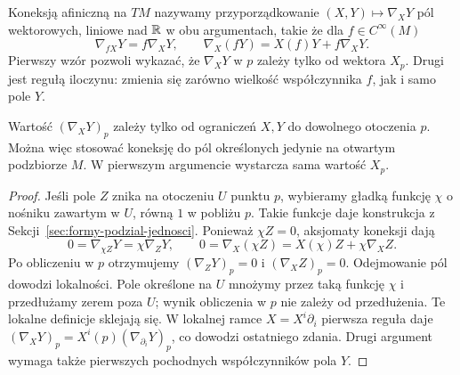 \begin{definicja}
\label{def:koneksja-afiniczna}
Koneksją afiniczną na $TM$ nazywamy przyporządkowanie
$(X,Y)\mapsto\nabla_XY$ pól wektorowych, liniowe
nad $\mathbb{R}$ w obu argumentach, takie że dla $f\in C^\infty(M)$
\begin{equation}\label{eq:koneksja-aksjomaty}
 \nabla_{fX}Y=f\nabla_XY,
 \qquad \nabla_X(fY)=X(f)Y+f\nabla_XY.
\end{equation}
Pierwszy wzór pozwoli wykazać, że $\nabla_XY$ w $p$ zależy
tylko od wektora $X_p$. Drugi jest regułą iloczynu:
zmienia się zarówno wielkość współczynnika $f$,
jak i samo pole $Y$.
\end{definicja}

\begin{lemat}
\label{lem:koneksja-lokalnosc}
Wartość $(\nabla_XY)_p$ zależy tylko od ograniczeń $X,Y$
do dowolnego otoczenia $p$. Można więc stosować koneksję
do pól określonych jedynie na otwartym podzbiorze $M$.
W pierwszym argumencie wystarcza sama wartość $X_p$.
\end{lemat}
\begin{proof}
Jeśli pole $Z$ znika na otoczeniu $U$ punktu $p$, wybieramy
gładką funkcję $\chi$ o nośniku zawartym w $U$, równą $1$
w pobliżu $p$. Takie funkcje daje konstrukcja z
Sekcji~\ref{sec:formy-podzial-jednosci}. Ponieważ $\chi Z=0$,
aksjomaty koneksji dają
\[
 0=\nabla_{\chi Z}Y=\chi\nabla_ZY,\qquad
 0=\nabla_X(\chi Z)=X(\chi)Z+\chi\nabla_XZ.
\]
Po obliczeniu w $p$ otrzymujemy $(\nabla_ZY)_p=0$
i $(\nabla_XZ)_p=0$. Odejmowanie pól dowodzi lokalności.
Pole określone na $U$ mnożymy przez taką funkcję $\chi$
i przedłużamy zerem poza $U$; wynik obliczenia w $p$
nie zależy od przedłużenia. Te lokalne definicje sklejają się.
W lokalnej ramce $X=X^i\partial_i$ pierwsza reguła daje
$(\nabla_XY)_p=X^i(p)(\nabla_{\partial_i}Y)_p$,
co dowodzi ostatniego zdania. Drugi argument wymaga
także pierwszych pochodnych współczynników pola $Y$.
\end{proof}

